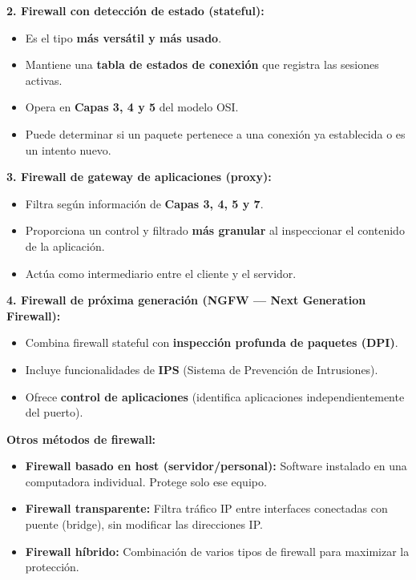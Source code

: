 \documentclass[11pt,a4paper]{article}
\begin{document}
\textbf{2. Firewall con detección de estado (stateful):}
\begin{itemize}[leftmargin=2em]
  \item Es el tipo \textbf{más versátil y más usado}.
  \item Mantiene una \textbf{tabla de estados de conexión} que registra las sesiones activas.
  \item Opera en \textbf{Capas 3, 4 y 5} del modelo OSI.
  \item Puede determinar si un paquete pertenece a una conexión ya establecida o es un intento nuevo.
\end{itemize}

\textbf{3. Firewall de gateway de aplicaciones (proxy):}
\begin{itemize}[leftmargin=2em]
  \item Filtra según información de \textbf{Capas 3, 4, 5 y 7}.
  \item Proporciona un control y filtrado \textbf{más granular} al inspeccionar el contenido de la aplicación.
  \item Actúa como intermediario entre el cliente y el servidor.
\end{itemize}

\textbf{4. Firewall de próxima generación (NGFW --- Next Generation Firewall):}
\begin{itemize}[leftmargin=2em]
  \item Combina firewall stateful con \textbf{inspección profunda de paquetes (DPI)}.
  \item Incluye funcionalidades de \textbf{IPS} (Sistema de Prevención de Intrusiones).
  \item Ofrece \textbf{control de aplicaciones} (identifica aplicaciones independientemente del puerto).
\end{itemize}

\textbf{Otros métodos de firewall:}
\begin{itemize}[leftmargin=2em]
  \item \textbf{Firewall basado en host (servidor/personal):} Software instalado en una computadora individual. Protege solo ese equipo.
  \item \textbf{Firewall transparente:} Filtra tráfico IP entre interfaces conectadas con puente (bridge), sin modificar las direcciones IP.
  \item \textbf{Firewall híbrido:} Combinación de varios tipos de firewall para maximizar la protección.
\end{itemize}
\end{document}
